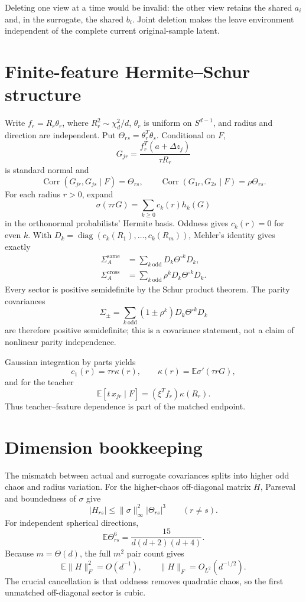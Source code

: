 \documentclass[11pt]{article}
\newcommand{\E}{\mathbb E}
\begin{document}
Deleting one view at a time would be invalid: the other view retains the shared \(a_i\) and, in the surrogate, the shared \(b_i\).  Joint deletion makes the leave environment independent of the complete current original-sample latent.

\section{Finite-feature Hermite--Schur structure}
Write \(f_r=R_r\theta_r\), where \(R_r^2\sim\chi_d^2/d\), \(\theta_r\) is uniform on \(S^{d-1}\), and radius and direction are independent.  Put \(\Theta_{rs}=\theta_r^T\theta_s\).  Conditional on \(F\),
\[
 G_{jr}=\frac{f_r^T(a+\Delta z_j)}{\tau R_r}
\]
is standard normal and
\[
 \operatorname{Corr}(G_{jr},G_{js}\mid F)=\Theta_{rs},
 \qquad
 \operatorname{Corr}(G_{1r},G_{2s}\mid F)=\rho\Theta_{rs}.
\]
For each radius \(r>0\), expand
\[
 \sigma(\tau rG)=\sum_{k\ge0}c_k(r)h_k(G)
\]
in the orthonormal probabilists' Hermite basis.  Oddness gives \(c_k(r)=0\) for even \(k\).  With \(D_k=\operatorname{diag}(c_k(R_1),\ldots,c_k(R_m))\), Mehler's identity gives exactly
\begin{align}
 \Sigma_A^{\mathrm{same}}&=\sum_{k\ \mathrm{odd}}D_k\Theta^{\circ k}D_k,\\
 \Sigma_A^{\mathrm{cross}}&=\sum_{k\ \mathrm{odd}}\rho^kD_k\Theta^{\circ k}D_k.
\end{align}
Every sector is positive semidefinite by the Schur product theorem.  The parity covariances
\[
 \Sigma_\pm=\sum_{k\ \mathrm{odd}}(1\pm\rho^k)D_k\Theta^{\circ k}D_k
\]
are therefore positive semidefinite; this is a covariance statement, not a claim of nonlinear parity independence.

Gaussian integration by parts yields
\[
 c_1(r)=\tau r\kappa(r),\qquad \kappa(r)=\E\sigma'(\tau rG),
\]
and for the teacher
\begin{equation}\label{eq:teacher}
 \E[t\,x_{jr}\mid F]=(\xi^Tf_r)\kappa(R_r).
\end{equation}
Thus teacher--feature dependence is part of the matched endpoint.

\section{Dimension bookkeeping}
The mismatch between actual and surrogate covariances splits into higher odd chaos and radius variation.  For the higher-chaos off-diagonal matrix \(H\), Parseval and boundedness of \(\sigma\) give
\[
 |H_{rs}|\le\|\sigma\|_\infty^2|\Theta_{rs}|^3\qquad(r\ne s).
\]
For independent spherical directions,
\[
 \E\Theta_{rs}^6=\frac{15}{d(d+2)(d+4)}.
\]
Because \(m=\Theta(d)\), the full \(m^2\) pair count gives
\begin{equation}\label{eq:highchaos}
 \E\|H\|_F^2=O(d^{-1}),\qquad \|H\|_F=O_{L^2}(d^{-1/2}).
\end{equation}
The crucial cancellation is that oddness removes quadratic chaos, so the first unmatched off-diagonal sector is cubic.
\end{document}
